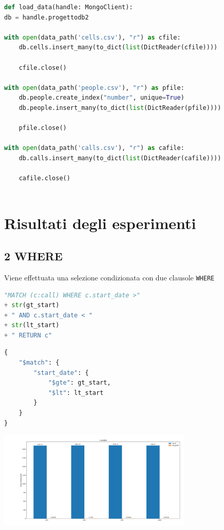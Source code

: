     \begin{lstlisting}[language=Python, caption=load\_data()]
def load_data(handle: MongoClient):
db = handle.progettodb2

with open(data_path('cells.csv'), "r") as cfile:
    db.cells.insert_many(to_dict(list(DictReader(cfile))))

    cfile.close()

with open(data_path('people.csv'), "r") as pfile:
    db.people.create_index("number", unique=True)
    db.people.insert_many(to_dict(list(DictReader(pfile))))

    pfile.close()

with open(data_path('calls.csv'), "r") as cafile:
    db.calls.insert_many(to_dict(list(DictReader(cafile))))

    cafile.close()
        
    \end{lstlisting}


\pagebreak
\section{Risultati degli esperimenti}
    \subsection{2 WHERE}
    Viene effettuata una selezione condizionata con due clausole \texttt{WHERE}

    \begin{lstlisting}[language=Python, caption=Neo4j]
"MATCH (c:call) WHERE c.start_date >" 
+ str(gt_start) 
+ " AND c.start_date < " 
+ str(lt_start) 
+ " RETURN c"
    \end{lstlisting}

    \begin{lstlisting}[language=Python, caption=MongoDB]
{
    "$match": {
        "start_date": {
            "$gte": gt_start,
            "$lt": lt_start
        }
    }
}
    \end{lstlisting}

    \includegraphics[width=350px, keepaspectratio]{query1.png}



